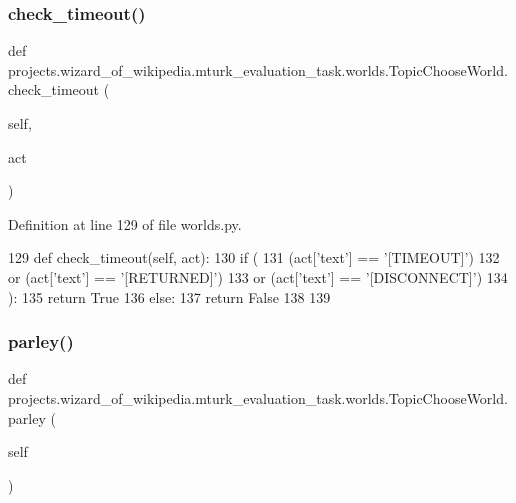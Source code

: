 \subsubsection{\texorpdfstring{check\+\_\+timeout()}{check\_timeout()}}
{\footnotesize\ttfamily def projects.\+wizard\+\_\+of\+\_\+wikipedia.\+mturk\+\_\+evaluation\+\_\+task.\+worlds.\+Topic\+Choose\+World.\+check\+\_\+timeout (\begin{DoxyParamCaption}\item[{}]{self,  }\item[{}]{act }\end{DoxyParamCaption})}



Definition at line 129 of file worlds.\+py.


\begin{DoxyCode}
129     \textcolor{keyword}{def }check\_timeout(self, act):
130         \textcolor{keywordflow}{if} (
131             (act[\textcolor{stringliteral}{'text'}] == \textcolor{stringliteral}{'[TIMEOUT]'})
132             \textcolor{keywordflow}{or} (act[\textcolor{stringliteral}{'text'}] == \textcolor{stringliteral}{'[RETURNED]'})
133             \textcolor{keywordflow}{or} (act[\textcolor{stringliteral}{'text'}] == \textcolor{stringliteral}{'[DISCONNECT]'})
134         ):
135             \textcolor{keywordflow}{return} \textcolor{keyword}{True}
136         \textcolor{keywordflow}{else}:
137             \textcolor{keywordflow}{return} \textcolor{keyword}{False}
138 
139 
\end{DoxyCode}
\mbox{\label{classprojects_1_1wizard__of__wikipedia_1_1mturk__evaluation__task_1_1worlds_1_1TopicChooseWorld_a1ede8a9a810cffefa36645ae3a3929bc}} 
\subsubsection{\texorpdfstring{parley()}{parley()}}
{\footnotesize\ttfamily def projects.\+wizard\+\_\+of\+\_\+wikipedia.\+mturk\+\_\+evaluation\+\_\+task.\+worlds.\+Topic\+Choose\+World.\+parley (\begin{DoxyParamCaption}\item[{}]{self }\end{DoxyParamCaption})}



